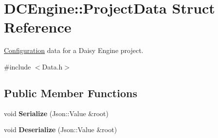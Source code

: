 \hypertarget{structDCEngine_1_1ProjectData}{\section{D\-C\-Engine\-:\-:Project\-Data Struct Reference}
\label{structDCEngine_1_1ProjectData}
}


\hyperlink{structConfiguration}{Configuration} data for a Daisy Engine project.  




{\ttfamily \#include $<$Data.\-h$>$}

\subsection*{Public Member Functions}
\begin{DoxyCompactItemize}
\item 
\hypertarget{structDCEngine_1_1ProjectData_afb06927f9b7038af0764a625a3478bc8}{void {\bfseries Serialize} (Json\-::\-Value \&root)}\label{structDCEngine_1_1ProjectData_afb06927f9b7038af0764a625a3478bc8}

\item 
\hypertarget{structDCEngine_1_1ProjectData_a7f885a4d7184495ab0978213bc102445}{void {\bfseries Deserialize} (Json\-::\-Value \&root)}\label{structDCEngine_1_1ProjectData_a7f885a4d7184495ab0978213bc102445}

\end{DoxyCompactItemize}
